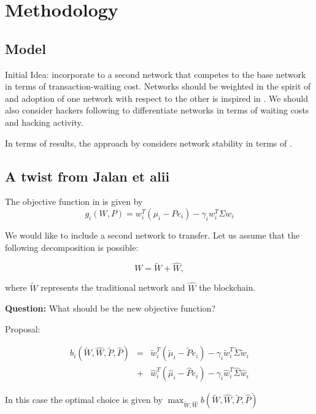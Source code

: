 
\chapter{Methodology} \label{capMethods} %


\section{Model}

Initial Idea: incorporate to  a second network that competes to the base network in terms of transaction-waiting cost. Networks should be weighted in the spirit of  and adoption of one network with respect to the other is inspired in . We should also consider hackers following  to differentiate networks in terms of waiting costs and hacking activity.

In terms of results, the approach by \cite{jalan_incentive-aware_2024} considers network stability in terms of \cite{bich_perfect_2023,bich_existence_2020}.

\section{A twist from Jalan et alii}

The objective function in  is given by
$$g_i(W,P)=w_i^T(\mu_i-Pe_i)-\gamma_iw_i^T\Sigma w_i$$

We would like to include a second network to transfer. Let us assume that the following decomposition is possible:

$$W=\tilde W+\hat W,$$

where $\tilde W$ represents the traditional network and $\hat W$ the blockchain.

{\bf Question:} What should be the new objective function?

Proposal: 

\begin{eqnarray}
    b_i(\tilde W,\hat W,\tilde P,\hat P)&=&\tilde w_i^T(\tilde \mu_i-\tilde Pe_i)-\gamma_i\tilde w_i^T\tilde \Sigma \tilde w_i\nonumber\\
            &+&\hat w_i^T(\hat \mu_i-\hat Pe_i)-\gamma_i\hat w_i^T\hat \Sigma \hat w_i\label{eq:b}
\end{eqnarray}

In this case the optimal choice is given by $\max_{\tilde W,\hat W}b(\tilde W,\hat W,\tilde P,\hat P)$

